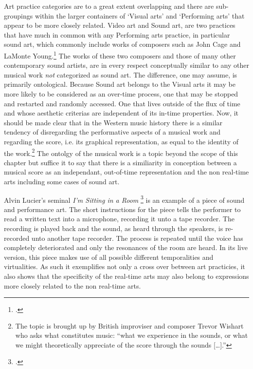 Art practice categories are to a great extent overlapping and there are sub-groupings within the larger containers of `Visual arts' and `Performing arts' that appear to be more closely related. Video art and Sound art, are two practices that have much in common with any Performing arts practice, in particular sound art, which commonly include works of composers such as John Cage and LaMonte Young.\footcite[See][]{labelle06} The works of these two composers and those of many other contemporary sound artists, are in every respect conceptually similar to any other musical work \emph{not} categorized as sound art. The difference, one may assume, is primarily ontological. Because Sound art belongs to the Visual arts it may be more likely to be considered as an over-time process, one that may be stopped and restarted and randomly accessed. One that lives outside of the flux of time and whose aesthetic criterias are independent of its in-time properties. Now, it should be made clear that in the Western music history there is a similar tendency of disregarding the performative aspects of a musical work and regarding the score, i.e. its graphical representation, as equal to the identity of the work.\footnote{The topic is brought up by British improviser and composer Trevor Wishart who asks what constitutes music: ``what we experience in the sounds, or what we might theoretically appreciate of the score through the sounds [\ldots].''} The ontolgy of the musical work is a topic beyond the scope of this chapter but suffice it to say that there is a similiarity in conception between a musical score as an independant, out-of-time representation and the non real-time arts
including some cases of sound art.

Alvin Lucier's seminal \emph{I'm Sitting in a Room} \footcite{lucier69,evens05,labelle06} is an example of a piece of sound and performance art. The short instructions for the piece tells the performer to read a written text into a microphone, recording it unto a tape recorder. The recording is played back and the sound, as heard through the speakers, is re-recorded unto another tape recorder. The process is repeated until the voice has completely deteriorated and only the resonances of the room are heard. In its live version, this piece makes use of all possible different temporalities and virtualities. As such it exemplifies not only a cross over between art practicies, it also shows that the specificity of the real-time arts may also belong to expressions more closely related to the non real-time arts.

